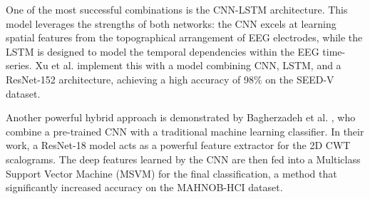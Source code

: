 \documentclass[conference]{IEEEtran}
\begin{document}
One of the most successful combinations is the CNN-LSTM architecture. This model leverages the strengths of both networks: the CNN excels at learning spatial features from the topographical arrangement of EEG electrodes, while the LSTM is designed to model the temporal dependencies within the EEG time-series. Xu et al. \cite{b4} implement this with a model combining CNN, LSTM, and a ResNet-152 architecture, achieving a high accuracy of 98\% on the SEED-V dataset.

Another powerful hybrid approach is demonstrated by Bagherzadeh et al. \cite{b2}, who combine a pre-trained CNN with a traditional machine learning classifier. In their work, a ResNet-18 model acts as a powerful feature extractor for the 2D CWT scalograms. The deep features learned by the CNN are then fed into a Multiclass Support Vector Machine (MSVM) for the final classification, a method that significantly increased accuracy on the MAHNOB-HCI dataset.
\end{document}

